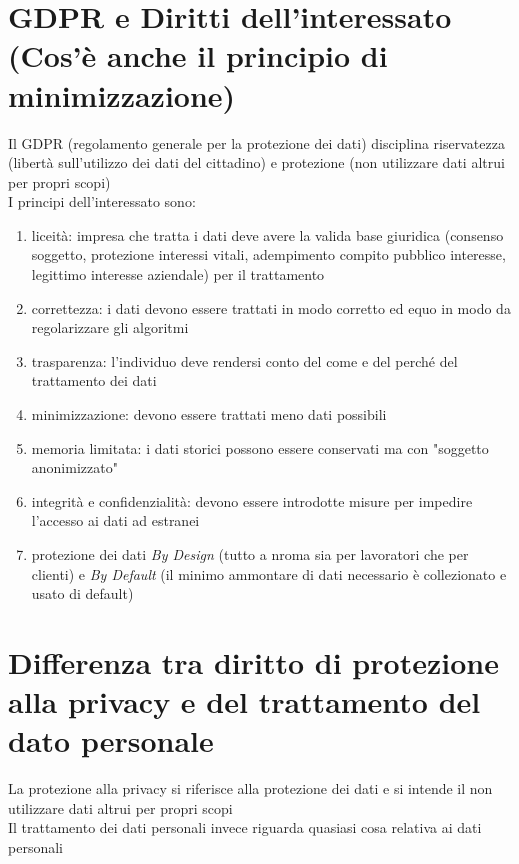 \documentclass[8pt,oneside,a4paper]{article}
\begin{document}
	\section{GDPR e Diritti dell'interessato (Cos'è anche il principio di minimizzazione)}
	Il GDPR (regolamento generale per la protezione dei dati) disciplina riservatezza (libertà sull'utilizzo dei dati del cittadino) e protezione (non utilizzare dati altrui per propri scopi)\\
	I principi dell'interessato sono:
	\begin{enumerate}
		\item liceità: impresa che tratta i dati deve avere la valida base giuridica (consenso soggetto, protezione interessi vitali, adempimento compito pubblico interesse, legittimo interesse aziendale) per il trattamento
		\item correttezza: i dati devono essere trattati in modo corretto ed equo in modo da regolarizzare gli algoritmi
		\item trasparenza: l'individuo deve rendersi conto del come e del perché del trattamento dei dati
		\item minimizzazione: devono essere trattati meno dati possibili
		\item memoria limitata: i dati storici possono essere conservati ma con "soggetto anonimizzato"
		\item integrità e confidenzialità: devono essere introdotte misure per impedire l'accesso ai dati ad estranei
		\item protezione dei dati \textit{By Design} (tutto a nroma sia per lavoratori che per clienti) e \textit{By Default} (il minimo ammontare di dati necessario è collezionato e usato di default)
	\end{enumerate}
	\section{Differenza tra diritto di protezione alla privacy e del trattamento del dato personale}
	La protezione alla privacy si riferisce alla protezione dei dati e si intende il non utilizzare dati altrui per propri scopi\\
	Il trattamento dei dati personali invece riguarda quasiasi cosa relativa ai dati personali
\end{document}
